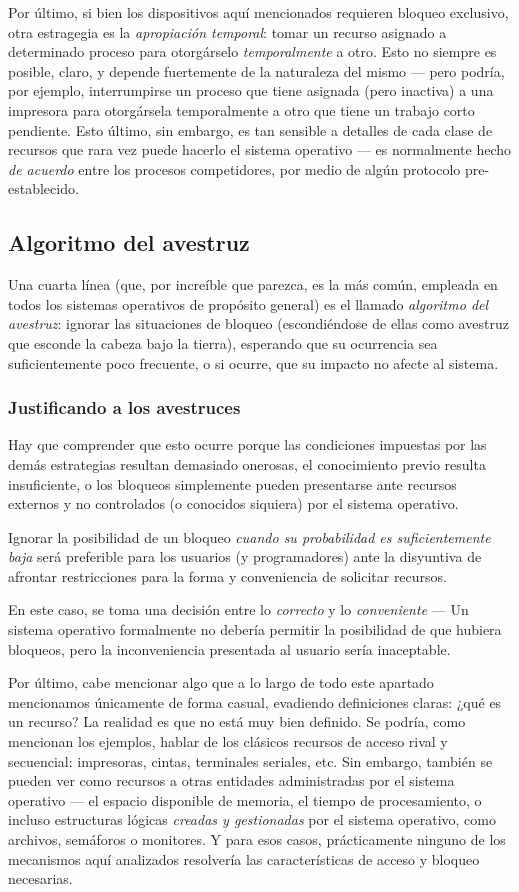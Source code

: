 \documentclass[11pt,fleqn]{book} %
\begin{document}
Por último, si bien los dispositivos aquí mencionados requieren
bloqueo exclusivo, otra estragegia es la \emph{apropiación temporal}: tomar
un recurso asignado a determinado proceso para otorgárselo
\emph{temporalmente} a otro. Esto no siempre es posible, claro, y depende
fuertemente de la naturaleza del mismo — pero podría, por ejemplo,
interrumpirse un proceso que tiene asignada (pero inactiva) a una
impresora para otorgársela temporalmente a otro que tiene un trabajo
corto pendiente. Esto último, sin embargo, es tan sensible a detalles
de cada clase de recursos que rara vez puede hacerlo el sistema
operativo — es normalmente hecho \emph{de acuerdo} entre los procesos
competidores, por medio de algún protocolo pre-establecido.
\subsection{Algoritmo del avestruz}
\label{sec-3-4-4}


Una cuarta línea (que, por increíble que parezca, es la más común,
empleada en todos los sistemas operativos de propósito general)
es el llamado \emph{algoritmo del avestruz}: ignorar
las situaciones de bloqueo (escondiéndose de ellas como avestruz que
esconde la cabeza bajo la tierra), esperando que su ocurrencia sea
suficientemente poco frecuente, o si ocurre, que su impacto no afecte
al sistema.
\subsubsection{Justificando a los avestruces}
\label{sec-3-4-4-1}


Hay que comprender que esto ocurre porque las condiciones impuestas
por las demás estrategias resultan demasiado onerosas, el conocimiento
previo resulta insuficiente, o los bloqueos simplemente pueden
presentarse ante recursos externos y no controlados (o conocidos
siquiera) por el sistema operativo.

Ignorar la posibilidad de un bloqueo \emph{cuando su probabilidad es suficientemente baja} será preferible para los usuarios (y
programadores) ante la disyuntiva de afrontar restricciones para la
forma y conveniencia de solicitar recursos.

En este caso, se toma una decisión entre lo \emph{correcto} y lo
\emph{conveniente} — Un sistema operativo formalmente no debería permitir
la posibilidad de que hubiera bloqueos, pero la inconveniencia
presentada al usuario sería inaceptable.

Por último, cabe mencionar algo que a lo largo de todo este apartado
mencionamos únicamente de forma casual, evadiendo definiciones claras:
¿qué es un recurso? La realidad es que no está muy bien
definido. Se podría, como mencionan los ejemplos, hablar de los
clásicos recursos de acceso rival y secuencial: impresoras, cintas,
terminales seriales, etc. Sin embargo, también se pueden ver como
recursos a otras entidades administradas por el sistema operativo — el
espacio disponible de memoria, el tiempo de procesamiento, o incluso
estructuras lógicas \emph{creadas y gestionadas} por el sistema operativo,
como archivos, semáforos o monitores. Y para esos casos, prácticamente
ninguno de los mecanismos aquí analizados resolvería las
características de acceso y bloqueo necesarias.
\end{document}
